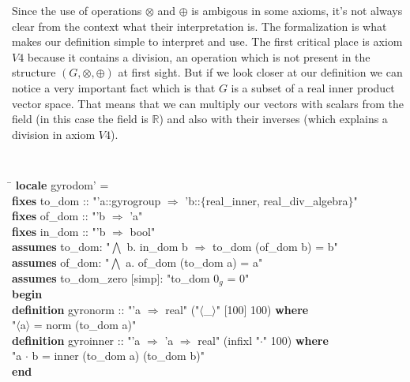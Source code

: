 \documentclass[a4paper]{article}
\theoremstyle{definition}
\begin{document}
Since the use of operations $\otimes$ and $\oplus$ is ambigous in some axioms, it's not always clear from the context what their interpretation is. The formalization is what makes our definition simple to interpret and use. 
The first critical place is axiom $V4$ because it contains a division, an operation which is not present in the structure $(G, \otimes, \oplus)$ at first sight. But if we look closer at our definition we can notice a very important fact which is that $G$ is a subset of a real inner product vector space. That means that we can multiply our vectors with scalars from the field (in this case the field is $\mathbb{R}$) and also with their inverses (which explains a division in axiom $V4$).

\begin{small}
{\tt
\begin{tabbing}
\hspace{5mm}\=\kill
{\bf locale} gyrodom' =\\
\> {\bf fixes} to\_dom :: "'a::gyrogroup $\Rightarrow$ 'b::$\{$real\_inner, real\_div\_algebra$\}$" 
\\
\> {\bf fixes} of\_dom :: "'b $\Rightarrow$ 'a"\\
\> {\bf fixes} in\_dom :: "'b $\Rightarrow$ bool"\\
\> {\bf assumes} to\_dom: "$\bigwedge$ b. in\_dom b $\Longrightarrow$ to\_dom (of\_dom b) = b"\\
\> {\bf assumes}  of\_dom: "$\bigwedge$ a. of\_dom (to\_dom a) = a"\\
\> {\bf assumes} to\_dom\_zero [simp]: "to\_dom $0_g$ = $0$"\\
{\bf begin}\\[2mm]
{\bf definition} gyronorm :: "'a $\Rightarrow$ real" ("$\langle$\_$\rangle$" [100] 100) {\bf where}\\
\>    
  "$\langle$a$\rangle$ = norm (to\_dom a)"\\
 {\bf definition} gyroinner :: "'a $\Rightarrow$ 'a $\Rightarrow$ real" (infixl "$\cdot$" 100) {\bf where}\\
\>    
  "a $\cdot$ b = inner (to\_dom a) (to\_dom b)"\\[2mm]
{\bf end}\\
\end{tabbing}
}
\end{small}
\end{document}
